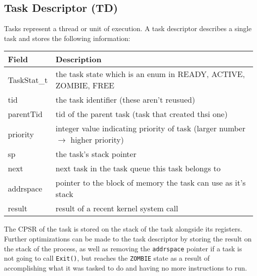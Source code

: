\documentclass[12pt]{article}
\begin{document}
\subsection{Task Descriptor (TD)}
Tasks represent a thread or unit of execution.  A task descriptor describes a single task and stores the following information:
\begin{center}
  \begin{tabular}{|l|l|}
    \hline
    {\bf Field} & {\bf Description} \\\hline
    TaskStat\_t & the task state which is an enum in {READY, ACTIVE, ZOMBIE, FREE} \\\hline
    tid & the task identifier (these aren't reusued) \\\hline
    parentTid & tid of the parent task (task that created thsi one) \\\hline
    priority & integer value indicating priority of task (larger number $\rightarrow$ higher priority) \\\hline
    sp & the task's stack pointer \\\hline
    next & next task in the task queue this task belongs to \\\hline
    addrspace & pointer to the block of memory the task can use as it's stack \\\hline
    result & result of a recent kernel system call \\\hline
  \end{tabular}
\end{center}
The CPSR of the task is stored on the stack of the task alongside its registers.  Further optimizations can be made to the task descriptor by storing the result on the stack of the process, as well as removing the \texttt{addrspace} pointer if a task is not going to call \texttt{Exit()}, but reaches the \texttt{ZOMBIE} state as a result of accomplishing what it was tasked to do and having no more instructions to run.\\
\end{document}

